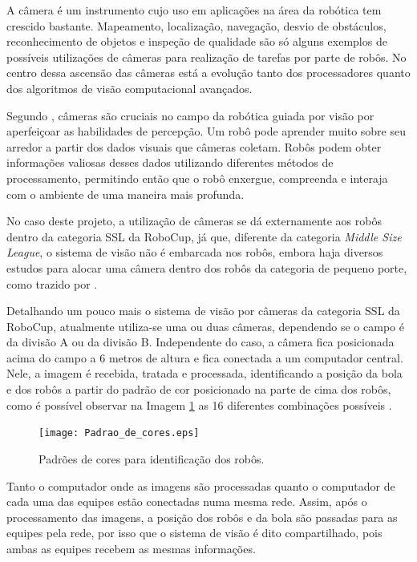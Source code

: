 \documentclass[acronym, symbols]{fei}
\begin{document}
				A câmera é um instrumento cujo uso em aplicações na área da robótica tem crescido bastante. Mapeamento, localização, navegação, desvio de obstáculos, reconhecimento de objetos e inspeção de qualidade são só alguns exemplos de possíveis utilizações de câmeras para realização de tarefas por parte de robôs. No centro dessa ascensão das câmeras está a evolução tanto dos processadores quanto dos algoritmos de visão computacional avançados.
				
				Segundo \textcite{cameras_technexion}, câmeras são cruciais no campo da robótica guiada por visão por aperfeiçoar as habilidades de percepção. Um robô pode aprender muito sobre seu arredor a partir dos dados visuais que câmeras coletam. Robôs podem obter informações valiosas desses dados utilizando diferentes métodos de processamento, permitindo então que o robô enxergue, compreenda e interaja com o ambiente de uma maneira mais profunda.
				
				No caso deste projeto, a utilização de câmeras se dá externamente aos robôs dentro da categoria SSL da RoboCup, já que, diferente da categoria \textit{Middle Size League}, o sistema de visão não é embarcada nos robôs, embora haja diversos estudos para alocar uma câmera dentro dos robôs da categoria de pequeno porte, como trazido por \textcite{melo2022embedded}.
				
				Detalhando um pouco mais o sistema de visão por câmeras da categoria SSL da RoboCup, atualmente utiliza-se uma ou duas câmeras, dependendo se o campo é da divisão A ou da divisão B. Independente do caso, a câmera fica posicionada acima do campo a 6 metros de altura e fica conectada a um computador central. Nele, a imagem é recebida, tratada e processada, identificando a posição da bola e dos robôs a partir do padrão de cor posicionado na parte de cima dos robôs, como é possível observar na Imagem \ref{fig:color_patterns} as 16 diferentes combinações possíveis \cite{10.1007/978-3-642-11876-0_37}.
				
				\begin{figure}[!htb]
					\centering
					\caption{Padrões de cores para identificação dos robôs.} 
					\texttt{[image: Padrao\_de\_cores.eps]}
					\label{fig:color_patterns}
				\end{figure}
			
				Tanto o computador onde as imagens são processadas quanto o computador de cada uma das equipes estão conectadas numa mesma rede. Assim, após o processamento das imagens, a posição dos robôs e da bola são passadas para as equipes pela rede, por isso que o sistema de visão é dito compartilhado, pois ambas as equipes recebem as mesmas informações.
			
\end{document}
